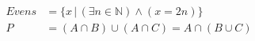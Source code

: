 \documentclass[a4paper,12pt]{article}
\begin{document}
\begin{align*}
	\mathit{Evens} &= \bigl\{x\,|\,(\exists n \in
		\mathbb{N}) \wedge (x = 2n)\bigr\}\\
	P &= (A \cap B) \cup (A \cap C) = A \cap (B \cup C)
\end{align*}
\end{document}
